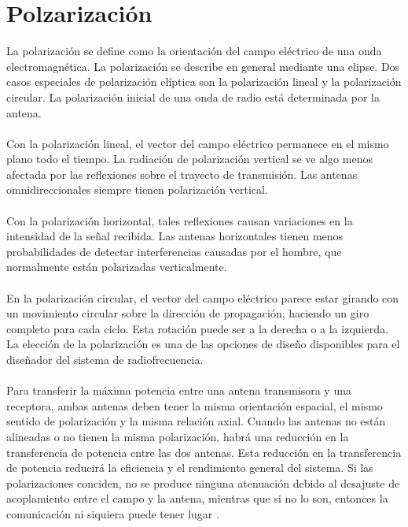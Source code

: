 \documentclass[12pt,letterpaper]{article}
\begin{document}
\section{Polzarización}
La polarización se define como la orientación del campo eléctrico de una onda 
electromagnética. La polarización se describe en general mediante una elipse. Dos casos 
especiales de polarización elíptica son la polarización lineal y la polarización circular. 
La polarización inicial de una onda de radio está determinada por la antena.
\\ \\
Con la polarización lineal, el vector del campo eléctrico permanece en el mismo plano 
todo el tiempo. La radiación de polarización vertical se ve algo menos afectada por las 
reflexiones sobre el trayecto de transmisión. Las antenas omnidireccionales siempre 
tienen polarización vertical. 
\\ \\
Con la polarización horizontal, tales reflexiones causan variaciones en la intensidad de 
la señal recibida. Las antenas horizontales tienen menos probabilidades de detectar 
interferencias causadas por el hombre, que normalmente están polarizadas verticalmente. 
\\ \\
En la polarización circular, el vector del campo eléctrico parece estar girando con un 
movimiento circular sobre la dirección de propagación, haciendo un giro completo para 
cada ciclo. Esta rotación puede ser a la derecha o a la izquierda. La elección de la 
polarización es una de las opciones de diseño disponibles para el diseñador del sistema 
de radiofrecuencia. 
\\ \\ 
Para transferir la máxima potencia entre una antena transmisora y una receptora, 
ambas antenas deben tener la misma orientación espacial, el mismo sentido de polarización 
y la misma relación axial. Cuando las antenas no están alineadas o no tienen la misma 
polarización, habrá una reducción en la transferencia de potencia entre las dos antenas. 
Esta reducción en la transferencia de potencia reducirá la eficiencia y el rendimiento 
general del sistema. Si las polarizaciones conciden, no se produce ninguna atenuación debido al 
desajuste de acoplamiento entre el campo y la antena, mientras que si no lo son, 
entonces la comunicación ni siquiera puede tener lugar \cite{polarizacion}.

\newpage
\end{document}
